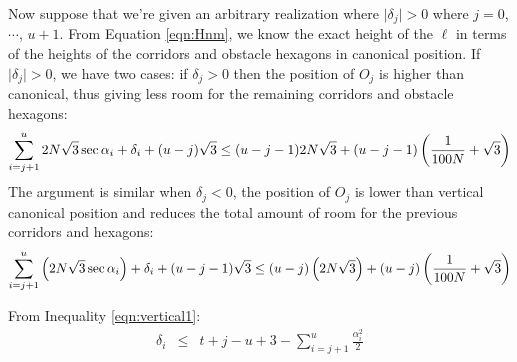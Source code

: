 Now suppose that we're given an arbitrary realization where $\vert \delta_j \vert > 0$ where $j = 0$, $\cdots$, $u+1$.  %
From Equation \ref{eqn:Hnm}, we know the exact height of the $\ell$ in terms of the heights of the corridors and obstacle hexagons in canonical position.
If $\vert \delta_j \vert > 0$, we have two cases: if $\delta_j > 0$ then the position of $O_j$ is higher than canonical, thus giving less room for the remaining corridors and obstacle hexagons:
\begin{equation}\label{eqn:vertical1}
\sum_{i=j+1}^u 2 N \sqrt{3}  \sec \alpha_i + \delta_i + (u - j) \sqrt{3} \leq (u-j-1) 2 N \sqrt{3}   + (u-j-1) \left( \frac{1}{100N} + \sqrt{3} \right)
\end{equation}
The argument is similar when $\delta_j < 0$, the position of $O_j$ is lower than vertical canonical position and reduces the total amount of room for the previous corridors and hexagons:
\begin{equation}\label{eqn:vertical2}
\sum_{i=j+1}^u \left( 2 N \sqrt{3} \sec \alpha_i  \right) + \delta_i + (u - j - 1) \sqrt{3} \leq (u - j) \left( 2 N \sqrt{3}  \right) + (u-j) \left( \frac{1}{100N} + \sqrt{3} \right)
\end{equation}

From Inequality \ref{eqn:vertical1}:
\begin{eqnarray*}
\delta_i &\leq& t+j-u+3 - \sum_{i=j+1}^{u}\frac{\alpha_i^2}{2}
\end{eqnarray*}
